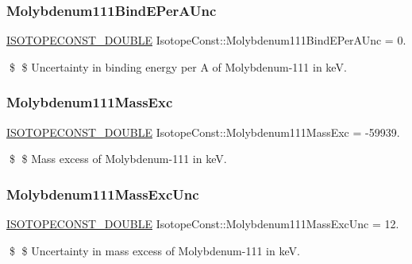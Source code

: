 \subsubsection{\texorpdfstring{Molybdenum111\+Bind\+E\+Per\+A\+Unc}{Molybdenum111BindEPerAUnc}}
{\footnotesize\ttfamily \mbox{\hyperlink{group___isotope_const-_macros_ga8f45a7272ce02c0b4c65c44636ed719a}{I\+S\+O\+T\+O\+P\+E\+C\+O\+N\+S\+T\+\_\+\+D\+O\+U\+B\+LE}} Isotope\+Const\+::\+Molybdenum111\+Bind\+E\+Per\+A\+Unc = 0.}

\$ \$ Uncertainty in binding energy per A of Molybdenum-\/111 in keV. \mbox{\label{group___isotope_const-_molybdenum-_mo111_ga13e68de7f6d4d2555d77942a0a16f046}} 
\subsubsection{\texorpdfstring{Molybdenum111\+Mass\+Exc}{Molybdenum111MassExc}}
{\footnotesize\ttfamily \mbox{\hyperlink{group___isotope_const-_macros_ga8f45a7272ce02c0b4c65c44636ed719a}{I\+S\+O\+T\+O\+P\+E\+C\+O\+N\+S\+T\+\_\+\+D\+O\+U\+B\+LE}} Isotope\+Const\+::\+Molybdenum111\+Mass\+Exc = -\/59939.}

\$ \$ Mass excess of Molybdenum-\/111 in keV. \mbox{\label{group___isotope_const-_molybdenum-_mo111_gadec576fb420f9c67aba2d5c0d033251b}} 
\subsubsection{\texorpdfstring{Molybdenum111\+Mass\+Exc\+Unc}{Molybdenum111MassExcUnc}}
{\footnotesize\ttfamily \mbox{\hyperlink{group___isotope_const-_macros_ga8f45a7272ce02c0b4c65c44636ed719a}{I\+S\+O\+T\+O\+P\+E\+C\+O\+N\+S\+T\+\_\+\+D\+O\+U\+B\+LE}} Isotope\+Const\+::\+Molybdenum111\+Mass\+Exc\+Unc = 12.}

\$ \$ Uncertainty in mass excess of Molybdenum-\/111 in keV. \mbox{\label{group___isotope_const-_molybdenum-_mo111_ga42c903b2906e77867947fbf14bae76ed}} 
